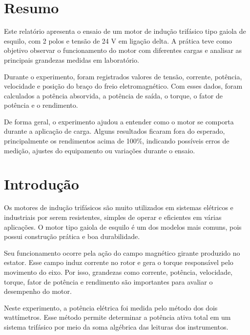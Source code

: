 \documentclass[12pt,a4paper]{article}
\begin{document}
\section{Resumo}

Este relatório apresenta o ensaio de um motor de indução trifásico tipo gaiola de esquilo, com 2 polos e tensão de 24 V em ligação delta. A prática teve como objetivo observar o funcionamento do motor com diferentes cargas e analisar as principais grandezas medidas em laboratório.

Durante o experimento, foram registrados valores de tensão, corrente, potência, velocidade e posição do braço do freio eletromagnético. Com esses dados, foram calculados a potência absorvida, a potência de saída, o torque, o fator de potência e o rendimento.

De forma geral, o experimento ajudou a entender como o motor se comporta durante a aplicação de carga. Alguns resultados ficaram fora do esperado, principalmente os rendimentos acima de 100\%, indicando possíveis erros de medição, ajustes do equipamento ou variações durante o ensaio.

\newpage

\section{Introdução}

Os motores de indução trifásicos são muito utilizados em sistemas elétricos e industriais por serem resistentes, simples de operar e eficientes em várias aplicações. O motor tipo gaiola de esquilo é um dos modelos mais comuns, pois possui construção prática e boa durabilidade.

Seu funcionamento ocorre pela ação do campo magnético girante produzido no estator. Esse campo induz corrente no rotor e gera o torque responsável pelo movimento do eixo. Por isso, grandezas como corrente, potência, velocidade, torque, fator de potência e rendimento são importantes para avaliar o desempenho do motor.

Neste experimento, a potência elétrica foi medida pelo método dos dois wattímetros. Esse método permite determinar a potência ativa total em um sistema trifásico por meio da soma algébrica das leituras dos instrumentos.
\end{document}
